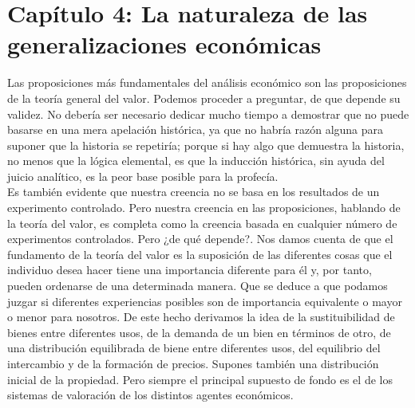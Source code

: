  \section{Capítulo 4: La naturaleza de las generalizaciones económicas}

 Las proposiciones más fundamentales del análisis económico son las proposiciones de la teoría general del valor. Podemos proceder a preguntar, de que depende su validez. No debería ser necesario dedicar mucho tiempo a demostrar que no puede basarse en una mera apelación histórica, ya que no habría razón alguna para suponer que la historia se repetiría; porque si hay algo que demuestra la historia, no menos que la lógica elemental, es que la inducción histórica, sin ayuda del juicio analítico, es la peor base posible para la profecía.\\
 Es también evidente que nuestra creencia no se basa en los resultados de un experimento controlado. Pero nuestra creencia en las proposiciones, hablando de la teoría del valor, es completa como la creencia basada en cualquier número de experimentos controlados. Pero ¿de qué depende?. Nos damos cuenta de que el fundamento de la teoría del valor es la suposición de las diferentes cosas que el individuo desea hacer tiene una importancia diferente para él y, por tanto, pueden ordenarse de una determinada manera. Que se deduce a que podamos juzgar si diferentes experiencias posibles son de importancia equivalente o mayor o menor para nosotros. De este hecho derivamos la idea de la sustituibilidad de bienes entre diferentes usos, de la demanda de un bien en términos de otro, de una distribución equilibrada de biene entre diferentes usos, del equilibrio del intercambio y de la formación de precios. Supones también una distribución inicial de la propiedad. Pero siempre el principal supuesto de fondo es el de los sistemas de valoración de los distintos agentes económicos.\\


